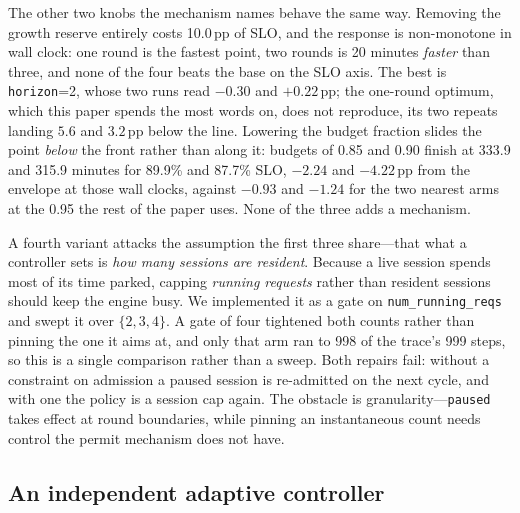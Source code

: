 The other two knobs the mechanism names behave the same way. Removing the growth
reserve entirely costs 10.0\,pp of SLO, and the response is non-monotone in wall
clock: one round is the fastest point, two rounds is 20 minutes \emph{faster} than
three, and none of the four beats the base on the SLO axis. The best is
\texttt{horizon}=2, whose two runs read $-0.30$ and $+0.22$\,pp; the one-round
optimum, which this paper spends the most words on, does not reproduce, its two
repeats landing $5.6$ and $3.2$\,pp below the line. Lowering the budget fraction
slides the point \emph{below} the front rather than along it: budgets of 0.85 and
0.90 finish at 333.9 and 315.9 minutes for 89.9\% and 87.7\% SLO, $-2.24$ and
$-4.22$\,pp from the envelope at
those wall clocks, against $-0.93$ and $-1.24$ for the two nearest arms at the
0.95 the rest of the paper uses. None of the three adds a mechanism.

A fourth variant attacks the assumption the first three share---that what a
controller sets is \emph{how many sessions are resident}. Because a live session
spends most of its time parked, capping \emph{running requests} rather than
resident sessions should keep the engine busy. We implemented it as a gate on
\texttt{num\_running\_reqs} and swept it over $\{2,3,4\}$. A gate of four
tightened both counts rather than pinning the one it aims at, and only that arm ran to 998
of the trace's 999 steps, so this is a single comparison rather than a sweep. Both
repairs fail: without a constraint on admission a paused session is re-admitted on
the next cycle, and with one the policy is a session cap again. The obstacle is
granularity---\texttt{paused} takes effect at round boundaries, while pinning an
instantaneous count needs control the permit mechanism does not have.

\subsection{An independent adaptive controller}
\label{sec:results:aimd}

